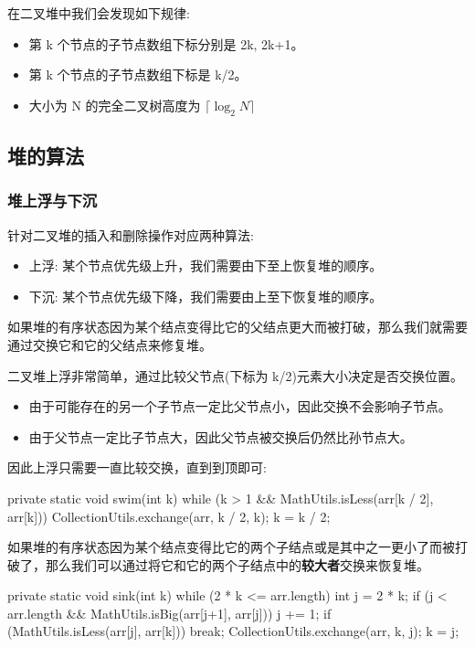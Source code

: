 在二叉堆中我们会发现如下规律:
\begin{itemize}
  \item 第 k 个节点的子节点数组下标分别是 2k, 2k+1。
  \item 第 k 个节点的子节点数组下标是 k/2。
  \item 大小为 N 的完全二叉树高度为 $\lceil \log_2 N \rceil$
\end{itemize}

\subsection{堆的算法}

\subsubsection{堆上浮与下沉}

针对二叉堆的插入和删除操作对应两种算法:
\begin{itemize}
    \item 上浮: 某个节点优先级上升，我们需要由下至上恢复堆的顺序。
    \item 下沉: 某个节点优先级下降，我们需要由上至下恢复堆的顺序。
\end{itemize}

如果堆的有序状态因为某个结点变得比它的父结点更大而被打破，那么我们就需要通过交换它和它的父结点来修复堆。

二叉堆上浮非常简单，通过比较父节点(下标为 k/2)元素大小决定是否交换位置。
\begin{itemize}
    \item 由于可能存在的另一个子节点一定比父节点小，因此交换不会影响子节点。
    \item 由于父节点一定比子节点大，因此父节点被交换后仍然比孙节点大。
\end{itemize}

因此上浮只需要一直比较交换，直到到顶即可:

\begin{Java}
private static void swim(int k) {
    while (k > 1 && MathUtils.isLess(arr[k / 2], arr[k])) {
        CollectionUtils.exchange(arr, k / 2, k);
        k = k / 2;
    }
}
\end{Java}

如果堆的有序状态因为某个结点变得比它的两个子结点或是其中之一更小了而被打破了，那么我们可以通过将它和它的两个子结点中的\textbf{较大者}交换来恢复堆。

\begin{Java}
private static void sink(int k) {
    while (2 * k <= arr.length) {
        int j = 2 * k;
        if (j < arr.length && MathUtils.isBig(arr[j+1], arr[j]))
            j += 1;
        if (MathUtils.isLess(arr[j], arr[k])) break;
        CollectionUtils.exchange(arr, k, j);
        k = j;
    }
}
\end{Java}

